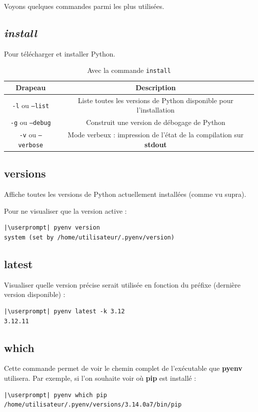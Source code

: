 Voyons quelques commandes parmi les plus utilisées.

\subsection*{\textit{install}}
Pour télécharger et installer Python.

\begin{table}[h!]
\centering
\begin{tabular}{|c|c|} %
\hline
    \textbf{Drapeau} & \textbf{Description} \\ \hline
    \texttt{-l} ou \texttt{--list} & Liste toutes les versions de Python disponible pour l'installation \\ \hline
    \texttt{-g} ou \texttt{--debug} & Construit une version de débogage de Python \\ \hline
    \texttt{-v} ou \texttt{--verbose} & Mode verbeux : impression de l'état de la compilation sur \textbf{stdout} \\ \hline
\end{tabular}
    \caption{Avec la commande \texttt{install}}
\end{table}

\subsection*{versions}
Affiche toutes les versions de Python actuellement installées (comme vu supra).

Pour ne visualiser que la version active :
\begin{lstlisting}[style=bash]
|\userprompt| pyenv version
system (set by /home/utilisateur/.pyenv/version)
\end{lstlisting}

\subsection*{latest}
Visualiser quelle version précise serait utilisée en fonction du préfixe (dernière version disponible) :
\begin{lstlisting}[style=bash]
|\userprompt| pyenv latest -k 3.12
3.12.11
\end{lstlisting}

\subsection*{which}
Cette commande permet de voir le chemin complet de l'exécutable que \textbf{pyenv} utilisera. Par exemple, si l'on souhaite voir où \textbf{pip} est installé :
\begin{lstlisting}[style=bash]
|\userprompt| pyenv which pip
/home/utilisateur/.pyenv/versions/3.14.0a7/bin/pip
\end{lstlisting}

